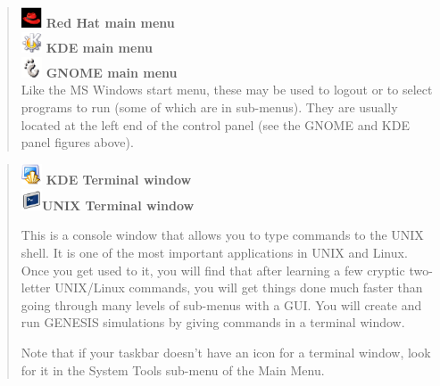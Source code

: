 \documentclass[12pt]{article}
\begin{document}
\begin{quote}
	\includegraphics[width=0.05\textwidth]{figures/redhat-main-menu32.eps} {\bf Red Hat main menu}\\
	 \includegraphics[width=0.05\textwidth]{figures/kmenu.eps} {\bf KDE main menu}\\
	 \includegraphics[width=0.05\textwidth]{figures/gnome-logo-icon32.eps} {\bf GNOME main menu}\\
	 Like the MS Windows start menu, these may be used to logout or to select programs to run (some of which are in sub-menus). They are usually located at the left end of the control panel (see the GNOME and KDE panel figures above).

\end{quote}

\begin{quote}
	\includegraphics[width=0.05\textwidth]{figures/konsole.eps} {\bf KDE Terminal window} \\
	\includegraphics[width=0.05\textwidth]{figures/gnome-term.eps}{\bf UNIX Terminal window}

This is a console window that allows you to type commands to the UNIX shell. It is one of the most important applications in UNIX and Linux. Once you get used to it, you will find that after learning a few cryptic two-letter UNIX/Linux commands, you will get things done much faster than going through many levels of sub-menus with a GUI. You will create and run GENESIS simulations by giving commands in a terminal window.

Note that if your taskbar doesn't have an icon for a terminal window, look for it in the System Tools sub-menu of the Main Menu.
\end{quote}
\end{document}
